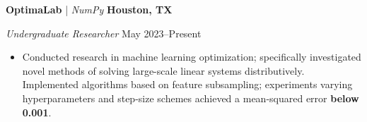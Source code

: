 \textbf{OptimaLab} | \textit{NumPy} \hfill \textbf{Houston, TX}\par
\textit{Undergraduate Researcher} \hfill May 2023--Present

\begin{itemize}
	\item Conducted research in machine learning optimization; specifically investigated novel methods of solving large-scale linear systems distributively. Implemented algorithms based on feature subsampling; experiments varying hyperparameters and step-size schemes achieved a mean-squared error \textbf{below 0.001}.
\end{itemize}\par

